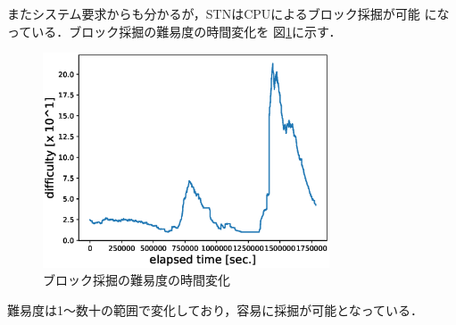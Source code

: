 \documentclass[graybox]{svmult}
\begin{document}
またシステム要求からも分かるが，STNはCPUによるブロック採掘が可能
になっている．ブロック採掘の難易度の時間変化を
図\ref{fig:difficulty}に示す．
%
\begin{figure}[t]
  \vspace{-45mm}
  \begin{center}
    \includegraphics[width=85mm]{time_vs_difficulty-plot.eps}
  \end{center}
  \vspace{45mm}
  \caption{ブロック採掘の難易度の時間変化}
  \label{fig:difficulty}
\end{figure}
%
難易度は1〜数十の範囲で変化しており，容易に採掘が可能となっている．
\end{document}

